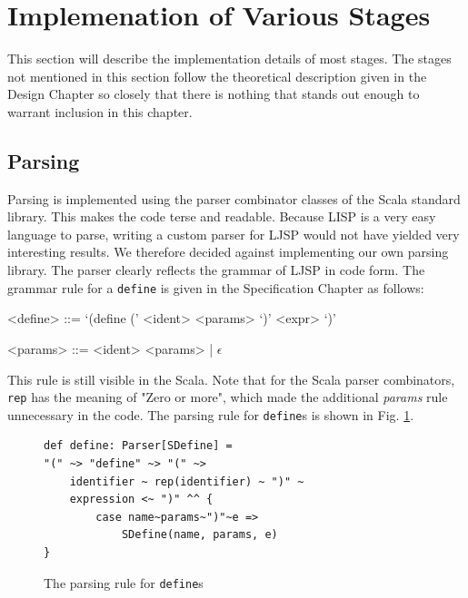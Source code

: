\documentclass[11pt]{report}
\begin{document}
\section{Implemenation of Various Stages}
This section will describe the implementation details of most stages. The stages not mentioned in this section follow the theoretical description given in the Design Chapter so closely that there is nothing that stands out enough to warrant inclusion in this chapter.
\subsection{Parsing}
Parsing is implemented using the parser combinator classes of the Scala standard library. This makes the code terse and readable. Because LISP is a very easy language to parse, writing a custom parser for LJSP would not have yielded very interesting results. We therefore decided against implementing our own parsing library. The parser clearly reflects the grammar of LJSP in code form. The grammar rule for a \texttt{define} is given in the Specification Chapter as follows:

\begin{grammar}
<define> ::= `(define (' <ident> <params> `)' <expr> `)'

<params> ::= <ident> <params> | $\epsilon$
\end{grammar}

This rule is still visible in the Scala. Note that for the Scala parser combinators, \texttt{rep} has the meaning of "Zero or more", which made the additional \textit{params} rule unnecessary in the code. The parsing rule for \texttt{define}s is shown in Fig. \ref{parsingrule}.

\begin{figure}[ht]
\begin{lstlisting}
def define: Parser[SDefine] = 
"(" ~> "define" ~> "(" ~> 
    identifier ~ rep(identifier) ~ ")" ~ 
    expression <~ ")" ^^ {
        case name~params~")"~e => 
            SDefine(name, params, e)
}
\end{lstlisting}
\caption{The parsing rule for \texttt{define}s}
\label{parsingrule}
\end{figure}
\end{document}
